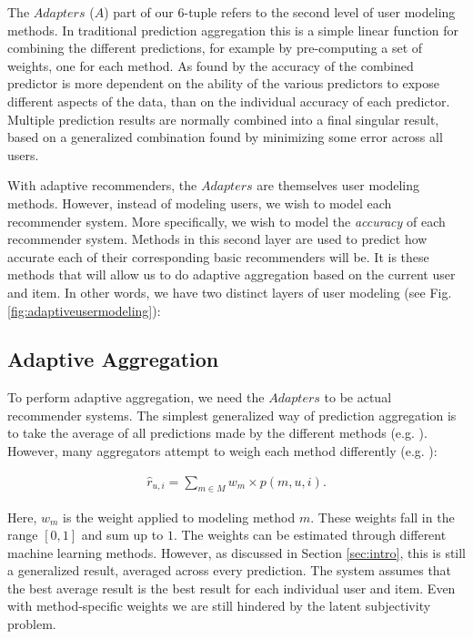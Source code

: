 The $Adapters$ ($A$) part of our 6-tuple refers to the second level of user modeling methods.
In traditional prediction aggregation this is a simple linear function for combining the different predictions,
for example by pre-computing a set of weights, one for each method.
As found by \cite[p6]{Bell2007} the accuracy of the combined predictor is more dependent on the 
ability of the various predictors to expose different aspects of the data, than on 
the individual accuracy of each predictor.
Multiple prediction results are normally combined into a final singular result,
based on a generalized combination found by minimizing some error across all users.

With adaptive recommenders, the $Adapters$ are themselves user modeling methods.
However, instead of modeling users, we wish to model each recommender system.
More specifically, we wish to model the \emph{accuracy} of each recommender system.
Methods in this second layer are used to predict how accurate each of their corresponding basic recommenders will be.
It is these methods that will allow us to do adaptive aggregation based on the current user and item.
In other words, we have two distinct layers of user modeling 
(see Fig. \ref{fig:adaptiveusermodeling}):



\subsection{Adaptive Aggregation}

To perform adaptive aggregation, we need the $Adapters$ to be actual recommender systems.
The simplest generalized way of prediction aggregation is to take the average of all predictions made
by the different methods (e.g. \cite[p3]{Aslam2001}).
However, many aggregators attempt to weigh each method differently (e.g. \cite{Claypool1999}):

\begin{eqnarray*}
  \hat{r}_{u,i} = \sum_{m \in M} w_{m} \times p(m,u,i).
\end{eqnarray*}

Here, $w_m$ is the weight applied to modeling method $m$. 
These weights fall in the range $[0,1]$ and sum up to $1$.
The weights can be estimated through different machine learning methods.
However, as discussed in Section \ref{sec:intro},
this is still a generalized result, averaged across every prediction.
The system assumes that the best average result is the best result for each individual user and item.
Even with method-specific weights we are still hindered by the latent subjectivity problem.

